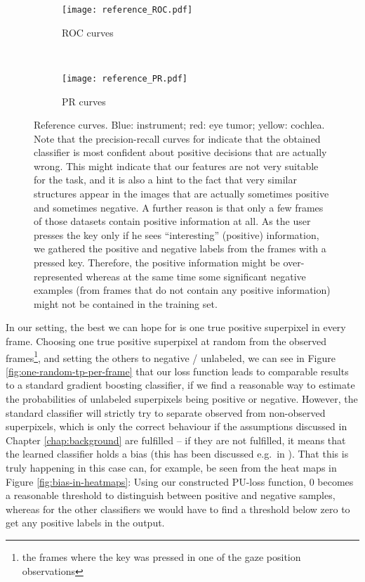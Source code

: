 \begin{figure}[ht]
	\centering
	\begin{subfigure}[h]{0.45\textwidth}
	\texttt{[image: reference\_ROC.pdf]}	
		\caption*{ROC curves}
	\end{subfigure}
	~
	\begin{subfigure}[h]{0.45\textwidth}
	\texttt{[image: reference\_PR.pdf]}	
		\caption*{PR curves}
	\end{subfigure}
	\caption{Reference curves. Blue: instrument; red: eye tumor; yellow: cochlea. Note that the precision-recall curves for indicate that the obtained classifier is most confident about positive decisions that are actually wrong. This might indicate that our features are not very suitable for the task, and it is also a hint to the fact that very similar structures appear in the images that are actually sometimes positive and sometimes negative. A further reason is that only a few frames of those datasets contain positive information at all. As the user presses the key only if he sees ``interesting'' (positive) information, we gathered the positive and negative labels from the frames with a pressed key. Therefore, the positive information might be over-represented whereas at the same time some significant negative examples (from frames that do not contain any positive information) might not be contained in the training set.}
	\label{fig:reference-known-labels}
\end{figure}

%

In our setting, the best we can hope for is one true positive superpixel in every frame. Choosing one true positive superpixel at random from the observed frames\footnote{the frames where the key was pressed in one of the gaze position observations}, and setting the others to negative / unlabeled, we can see in Figure \ref{fig:one-random-tp-per-frame} that our loss function leads to comparable results to a standard gradient boosting classifier, if we find a reasonable way to estimate the probabilities  of unlabeled superpixels being positive or negative. However, the standard classifier will strictly try to separate observed from non-observed superpixels, which is only the correct behaviour if the assumptions discussed in Chapter \ref{chap:background} are fulfilled -- if they are not fulfilled, it means that the learned classifier holds a bias (this has been discussed e.g.\ in ). That this is truly happening in this case can, for example, be seen from the heat maps in Figure \ref{fig:bias-in-heatmaps}: Using our constructed PU-loss function, 0 becomes a reasonable threshold to distinguish between positive and negative samples, whereas for the other classifiers we would have to find a threshold below zero to get any positive labels in the output.

